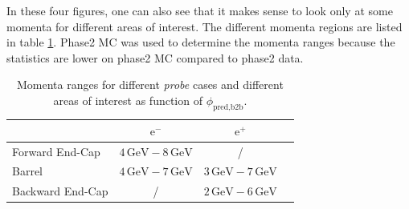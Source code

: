 \documentclass[a4paper,11pt,twosided,final,german,openbib,pdftex,listof=totoc,bibliography=totoc]{scrbook}
\begin{document}
In these four figures, one can also see that it makes sense to look only at some momenta for different areas of interest. The different momenta regions are listed in table \ref{tab:RTPMDTable}. Phase2 MC was used to determine the momenta ranges because the statistics are lower on phase2 MC compared to phase2 data. 


\begin{table}[h!]
	\centering
	\begin{tabular}{lccc}
		&$\textrm{e}^-$ &$\textrm{e}^+$\\
		\hline
		Forward End-Cap &$4\,\textrm{GeV} - 8\,\textrm{GeV}$&/\\
		Barrel &$4\,\textrm{GeV} - 7\,\textrm{GeV}$&$3\,\textrm{GeV} - 7\,\textrm{GeV}$\\
		Backward End-Cap & /&$2\,\textrm{GeV} - 6\,\textrm{GeV}$\\	
	\end{tabular}
	
	\caption[Areas Of Interest Different Momenta Ranges For Tracking Efficiency As Function Of $\phi_{\textrm{pred,b2b}}$]{Momenta ranges for different \textit{probe} cases and different areas of interest as function of $\phi_{\textrm{pred,b2b}}$.}
	\label{tab:RTPMDTable}
\end{table}
\end{document}
